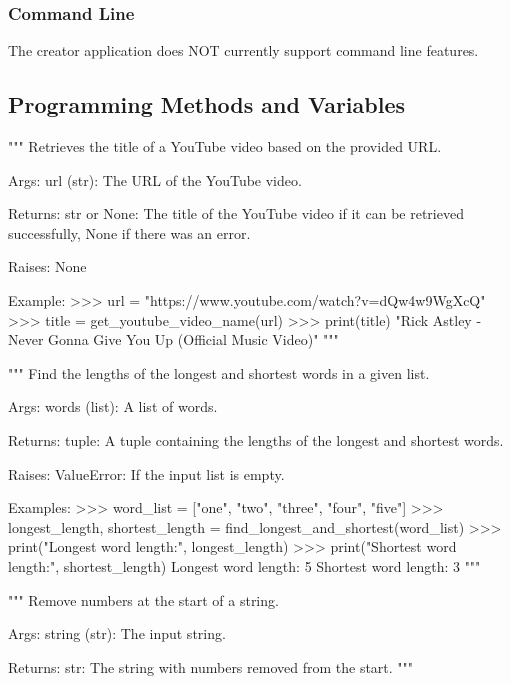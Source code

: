 \subsubsection{Command Line}

The creator application does NOT currently support command line features.

\subsection{Programming Methods and Variables}

\begin{codebox}
"""
Retrieves the title of a YouTube video based on the provided URL.

Args:
    url (str): The URL of the YouTube video.

Returns:
    str or None: The title of the YouTube video if it can be retrieved successfully,
                 None if there was an error.

Raises:
    None

Example:
    >>> url = "https://www.youtube.com/watch?v=dQw4w9WgXcQ"
    >>> title = get_youtube_video_name(url)
    >>> print(title)
    "Rick Astley - Never Gonna Give You Up (Official Music Video)"
"""
\end{codebox}

\begin{codebox}
"""
Find the lengths of the longest and shortest words in a given list.

Args:
    words (list): A list of words.

Returns:
    tuple: A tuple containing the lengths of the longest and shortest words.

Raises:
    ValueError: If the input list is empty.

Examples:
    >>> word_list = ["one", "two", "three", "four", "five"]
    >>> longest_length, shortest_length = find_longest_and_shortest(word_list)
    >>> print("Longest word length:", longest_length)
    >>> print("Shortest word length:", shortest_length)
    Longest word length: 5
    Shortest word length: 3
"""
\end{codebox}

\begin{codebox}
"""
Remove numbers at the start of a string.

Args:
    string (str): The input string.

Returns:
    str: The string with numbers removed from the start.
"""
\end{codebox}

